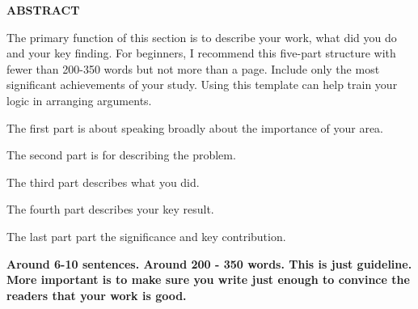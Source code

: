 {}

\begin{center}
    \large{\bf ABSTRACT}
\end{center}

The primary function of this section is to describe your work, what did you do and your key finding. For beginners, I recommend this five-part structure with fewer than 200-350 words but not more than a page.  Include only the most significant achievements of your study.  Using this template can help train your logic in arranging arguments. 

The first part is about speaking broadly about the importance of your area.  

The second part is for describing the problem.  

The third part describes what you did.

The fourth part describes your key result.  

The last part part the significance and key contribution.

\textbf{Around 6-10 sentences.  Around 200 - 350 words.  This is just guideline.  More important is to make sure you write just enough to convince the readers that your work is good.}

